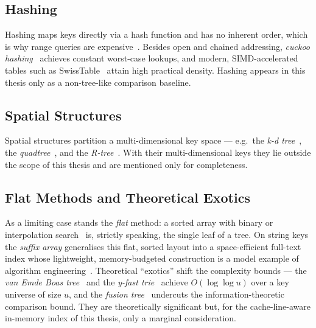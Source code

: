 \subsection{Hashing}\label{ssec:hashing}
Hashing maps keys directly via a hash function and has no inherent order, which is why range queries
are expensive~\cite{knuth1998taocp3}. Besides open and chained addressing,
\emph{cuckoo hashing}~\cite{pagh2004cuckoo} achieves constant worst-case lookups, and modern,
SIMD-accelerated tables such as SwissTable~\cite{abseil_swisstable} attain high practical density.
Hashing appears in this thesis only as a non-tree-like comparison baseline.

\subsection{Spatial Structures}\label{ssec:spatial}
Spatial structures partition a multi-dimensional key space --- e.g.\ the
\emph{k-d tree}~\cite{bentley1975kdtree}, the \emph{quadtree}~\cite{finkel1974quadtree}, and the
\emph{R-tree}~\cite{guttman1984rtree}. With their multi-dimensional keys they lie outside the scope
of this thesis and are mentioned only for completeness.

\subsection{Flat Methods and Theoretical Exotics}\label{ssec:flat-exotic}
As a limiting case stands the \emph{flat} method: a sorted array with binary or interpolation
search~\cite{knuth1998taocp3} is, strictly speaking, the single leaf of a tree. On string keys the
\emph{suffix array} generalises this flat, sorted layout into a space-efficient full-text index
whose lightweight, memory-budgeted construction is a model example of algorithm
engineering~\cite{manzini2002suffixarray}. Theoretical ``exotics'' shift the complexity bounds ---
the \emph{van Emde Boas tree}~\cite{vanemdeboas1975} and the
\emph{y-fast trie}~\cite{willard1983yfast} achieve $O(\log\log u)$ over a key universe of size $u$,
and the \emph{fusion tree}~\cite{fredman1993fusion} undercuts the information-theoretic comparison
bound. They are theoretically significant but, for the cache-line-aware in-memory index of this
thesis, only a marginal consideration.

